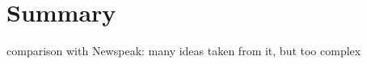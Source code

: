 \chapter{Summary}
\label{sec:summary}
comparison with Newspeak: many ideas taken from it, but too complex